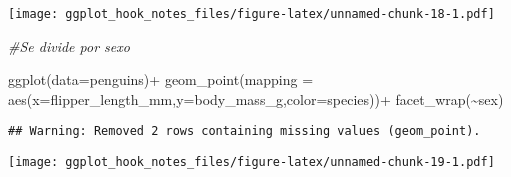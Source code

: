 \documentclass[
]{article}
\newenvironment{Shaded}{\begin{snugshade}}{\end{snugshade}}
\newcommand{\AttributeTok}[1]{\textcolor[rgb]{0.77,0.63,0.00}{#1}}
\newcommand{\CommentTok}[1]{\textcolor[rgb]{0.56,0.35,0.01}{\textit{#1}}}
\newcommand{\FunctionTok}[1]{\textcolor[rgb]{0.00,0.00,0.00}{#1}}
\newcommand{\NormalTok}[1]{#1}
\newcommand{\SpecialCharTok}[1]{\textcolor[rgb]{0.00,0.00,0.00}{#1}}
\begin{document}
\texttt{[image: ggplot\_hook\_notes\_files/figure-latex/unnamed-chunk-18-1.pdf]}

\begin{Shaded}
\begin{Highlighting}[]
\CommentTok{\#Se divide por sexo}
\end{Highlighting}
\end{Shaded}

\begin{Shaded}
\begin{Highlighting}[]
\FunctionTok{ggplot}\NormalTok{(}\AttributeTok{data=}\NormalTok{penguins)}\SpecialCharTok{+}
  \FunctionTok{geom\_point}\NormalTok{(}\AttributeTok{mapping =} \FunctionTok{aes}\NormalTok{(}\AttributeTok{x=}\NormalTok{flipper\_length\_mm,}\AttributeTok{y=}\NormalTok{body\_mass\_g,}\AttributeTok{color=}\NormalTok{species))}\SpecialCharTok{+}
  \FunctionTok{facet\_wrap}\NormalTok{(}\SpecialCharTok{\textasciitilde{}}\NormalTok{sex)}
\end{Highlighting}
\end{Shaded}

\begin{verbatim}
## Warning: Removed 2 rows containing missing values (geom_point).
\end{verbatim}

\texttt{[image: ggplot\_hook\_notes\_files/figure-latex/unnamed-chunk-19-1.pdf]}
\end{document}
